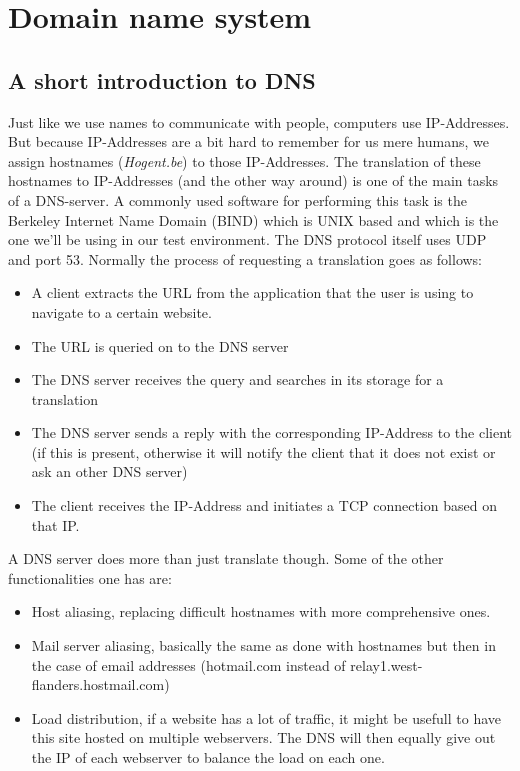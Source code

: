 \section{ Domain name system}
\subsection{A short introduction to DNS}
Just like we use names to communicate with people, computers use IP-Addresses. But because IP-Addresses are a bit hard to remember for us mere humans, we assign hostnames (\textit{Hogent.be}) to those IP-Addresses. The translation of these hostnames to IP-Addresses (and the other way around) is one of the main tasks of a DNS-server. A commonly used software for performing this task is the Berkeley Internet Name Domain (BIND) which is UNIX based and which is the one we'll be using in our test environment. The DNS protocol itself uses UDP and port 53. Normally the process of requesting a translation goes as follows:
\begin{itemize}
\item A client extracts the URL from the application that the user is using to navigate to a certain website.
\item The URL is queried on to the DNS server
\item The DNS server receives the query and searches in its storage for a translation
\item The DNS server sends a reply with the corresponding IP-Address to the client (if this is present, otherwise it will notify the client that it does not exist or ask an other DNS server)
\item The client receives the IP-Address and initiates a TCP connection based on that IP.
\end{itemize}
A DNS server does more than just translate though. Some of the other functionalities one has are:
\begin{itemize}
\item Host aliasing, replacing difficult hostnames with more comprehensive ones.
\item Mail server aliasing, basically the same as done with hostnames but then in the case of email addresses (hotmail.com instead of relay1.west-flanders.hostmail.com)
\item Load distribution, if a website has a lot of traffic, it might be usefull to have this site hosted on multiple webservers. The DNS will then equally give out the IP of each webserver to balance the load on each one.
\end{itemize}
